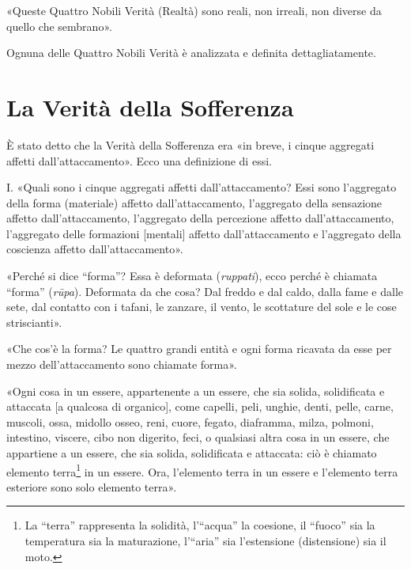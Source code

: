 

«Queste Quattro Nobili Verità (Realtà) sono reali, non irreali, non
diverse da quello che sembrano».




 Ognuna delle Quattro Nobili Verità è analizzata e
definita dettagliatamente.


\hypertarget{x-la-verità-della-sofferenza}{\section*{La Verità della Sofferenza}}
 È stato detto che la Verità della Sofferenza era «in
breve, i cinque aggregati affetti dall’attaccamento». Ecco una
definizione di essi.


 I. «Quali sono i cinque aggregati affetti dall’attaccamento?
Essi sono l’aggregato della forma (materiale) affetto dall’attaccamento,
l’aggregato della sensazione affetto dall’attaccamento, l’aggregato
della percezione affetto dall’attaccamento, l’aggregato delle formazioni
[mentali] affetto dall’attaccamento e l’aggregato della coscienza
affetto dall’attaccamento».




«Perché si dice “forma”? Essa è deformata (\emph{ruppati}), ecco perché è
chiamata “forma” (\emph{rūpa}). Deformata da che cosa? Dal freddo e dal
caldo, dalla fame e dalle sete, dal contatto con i tafani, le zanzare,
il vento, le scottature del sole e le cose striscianti».




«Che cos’è la forma? Le quattro grandi entità e ogni forma ricavata da
esse per mezzo dell’attaccamento sono chiamate forma».




«Ogni cosa in un essere, appartenente a un essere, che sia solida,
solidificata e attaccata [a qualcosa di organico], come capelli, peli,
unghie, denti, pelle, carne, muscoli, ossa, midollo osseo, reni, cuore,
fegato, diaframma, milza, polmoni, intestino, viscere, cibo non
digerito, feci, o qualsiasi altra cosa in un essere, che appartiene a un
essere, che sia solida, solidificata e attaccata: ciò è chiamato
elemento terra\footnote{La “terra” rappresenta la solidità, l’“acqua” la coesione, il “fuoco” sia la temperatura sia la maturazione, l’“aria” sia l’estensione (distensione) sia il moto.} in un essere. Ora, l’elemento terra in
un essere e l’elemento terra esteriore sono solo elemento terra».


